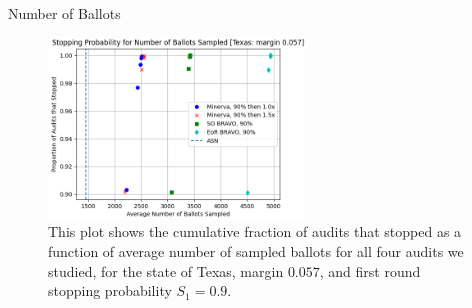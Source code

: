 \documentclass[final]{beamer}
\newlength{\colwidth}
\begin{document}
\begin{frame}[t]
\begin{columns}[t]
\begin{column}{\colwidth}
\begin{block}{Number of Ballots}
\begin{figure}
\begin{centering}
\includegraphics[width=0.605\textwidth]{texas90.png}
\caption{This plot shows the cumulative fraction of audits that stopped as a function of average number of sampled ballots for all four audits we studied, for the state of Texas, margin $0.057$, and first round stopping probability $S_1=0.9$.}
\label{fig:texas_90}
\end{centering}
\end{figure}



\end{block}


\end{column}
\end{columns}
\end{frame}
\end{document}
